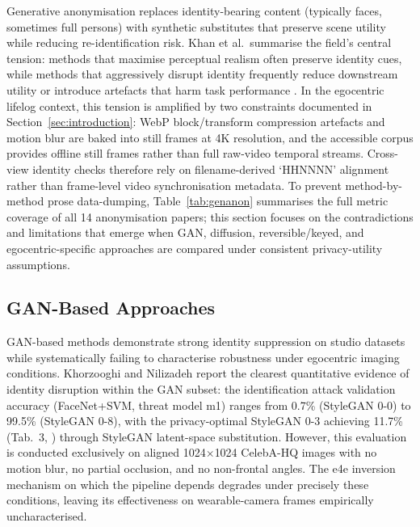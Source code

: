 \documentclass[12pt, onecolumn]{IEEEtran}
\begin{document}
Generative anonymisation replaces identity-bearing content (typically
faces, sometimes full persons) with synthetic substitutes that preserve
scene utility while reducing re-identification risk. Khan et al.\
summarise the field's central tension: methods that maximise perceptual
realism often preserve identity cues, while methods that aggressively
disrupt identity frequently reduce downstream utility or introduce
artefacts that harm task performance \cite{khan2024survey}. In the egocentric lifelog
context, this tension is amplified by two constraints documented in
Section~\ref{sec:introduction}: WebP block/transform compression artefacts and motion
blur are baked into still frames at 4K resolution, and the accessible corpus
provides offline still frames rather than full raw-video temporal streams.
Cross-view identity checks therefore rely on filename-derived `HHNNNN'
alignment rather than frame-level video synchronisation metadata. To prevent method-by-method prose data-dumping,
Table~\ref{tab:genanon} summarises the full metric coverage of all 14
anonymisation papers; this section focuses on the contradictions and
limitations that emerge when GAN, diffusion, reversible/keyed, and
egocentric-specific approaches are compared under consistent
privacy-utility assumptions.

\subsection{GAN-Based Approaches}

GAN-based methods demonstrate strong identity suppression on studio
datasets while systematically failing to characterise robustness under
egocentric imaging conditions. Khorzooghi and Nilizadeh report the
clearest quantitative evidence of identity disruption within the GAN
subset: the identification attack validation accuracy (FaceNet+SVM, threat model m1) ranges from 0.7\% (StyleGAN 0-0) to 99.5\% (StyleGAN 0-8), with the privacy-optimal StyleGAN 0-3 achieving 11.7\% (Tab.~3, \cite{khorzooghi2023gan}) through
StyleGAN latent-space substitution. However,
this evaluation is conducted exclusively on aligned 1024$\times$1024 CelebA-HQ
images with no motion blur, no partial occlusion, and no non-frontal
angles. The e4e inversion mechanism on which the pipeline depends
degrades under precisely these conditions, leaving its effectiveness on
wearable-camera frames empirically uncharacterised.
\end{document}
